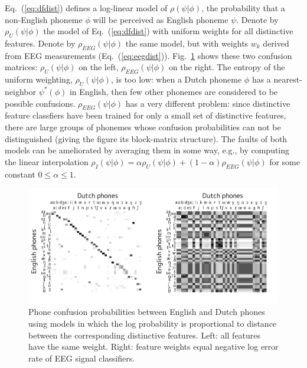 Eq.~(\ref{eq:dfdist}) defines a log-linear model of $\rho(\psi|\phi)$,
the probability that a non-English phoneme $\phi$ will be perceived as
English phoneme $\psi$.  Denote by $\rho_U(\psi|\phi)$ the model of
Eq.~(\ref{eq:dfdist}) with uniform weights for all distinctive
features. Denote by
$\rho_{EEG}(\psi|\phi)$ the same model, but with weights $w_k$ derived
from EEG measurements (Eq.~(\ref{eq:eegdist})).
Fig.~\ref{fig:eeg_confusions} shows these two confusion matrices:
$\rho_U(\psi|\phi)$ on the left, $\rho_{EEG}(\psi|\phi)$ on the
right. The entropy of the uniform weighting, $\rho_U(\psi|\phi)$, is
too low: when a Dutch phoneme $\phi$ has a nearest-neighbor
$\psi^*(\phi)$ in English, then few other phonemes are considered to
be possible confusions.  $\rho_{EEG}(\psi|\phi)$ has a very different
problem: since distinctive feature classfiers have been trained for
only a small set of distinctive features, there are large groups of
phonemes whose confusion probabilities can not be distinguished
(giving the figure its block-matrix structure).  The faults of both
models can be ameliorated by averaging them in some way, e.g., by
computing the linear interpolation
$\rho_I(\psi|\phi)=\alpha\rho_U(\psi|\phi)+(1-\alpha)\rho_{EEG}(\psi|\phi)$ for
some constant $0\le\alpha\le 1$.

\begin{figure}
  \centerline{
    \includegraphics{../figs/confusion-matrix/confusion-matrices.pdf}
  }
    \vspace*{-0.3cm}
  \caption{Phone confusion probabilities between English and Dutch
    phones using models in which the log
    probability is proportional to distance between the corresponding
    distinctive features.  Left: all features have the same
    weight.  Right: feature weights equal negative log error rate of
    EEG signal classifiers.}
  \label{fig:eeg_confusions}
\end{figure}

